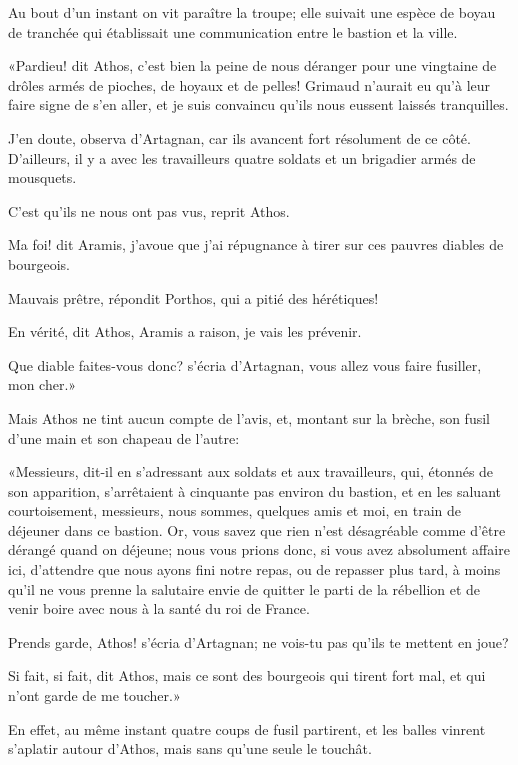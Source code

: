 Au bout d'un instant on vit paraître la troupe; elle suivait une espèce de boyau de tranchée qui établissait une communication entre le bastion et la ville. 

«Pardieu! dit Athos, c'est bien la peine de nous déranger pour une vingtaine de drôles armés de pioches, de hoyaux et de pelles! Grimaud n'aurait eu qu'à leur faire signe de s'en aller, et je suis convaincu qu'ils nous eussent laissés tranquilles. 

\speak  J'en doute, observa d'Artagnan, car ils avancent fort résolument de ce côté. D'ailleurs, il y a avec les travailleurs quatre soldats et un brigadier armés de mousquets. 

\speak  C'est qu'ils ne nous ont pas vus, reprit Athos. 

\speak  Ma foi! dit Aramis, j'avoue que j'ai répugnance à tirer sur ces pauvres diables de bourgeois. 

\speak  Mauvais prêtre, répondit Porthos, qui a pitié des hérétiques! 

\speak  En vérité, dit Athos, Aramis a raison, je vais les prévenir. 

\speak  Que diable faites-vous donc? s'écria d'Artagnan, vous allez vous faire fusiller, mon cher.» 

Mais Athos ne tint aucun compte de l'avis, et, montant sur la brèche, son fusil d'une main et son chapeau de l'autre: 

«Messieurs, dit-il en s'adressant aux soldats et aux travailleurs, qui, étonnés de son apparition, s'arrêtaient à cinquante pas environ du bastion, et en les saluant courtoisement, messieurs, nous sommes, quelques amis et moi, en train de déjeuner dans ce bastion. Or, vous savez que rien n'est désagréable comme d'être dérangé quand on déjeune; nous vous prions donc, si vous avez absolument affaire ici, d'attendre que nous ayons fini notre repas, ou de repasser plus tard, à moins qu'il ne vous prenne la salutaire envie de quitter le parti de la rébellion et de venir boire avec nous à la santé du roi de France. 

\speak  Prends garde, Athos! s'écria d'Artagnan; ne vois-tu pas qu'ils te mettent en joue? 

\speak  Si fait, si fait, dit Athos, mais ce sont des bourgeois qui tirent fort mal, et qui n'ont garde de me toucher.» 

En effet, au même instant quatre coups de fusil partirent, et les balles vinrent s'aplatir autour d'Athos, mais sans qu'une seule le touchât. 

